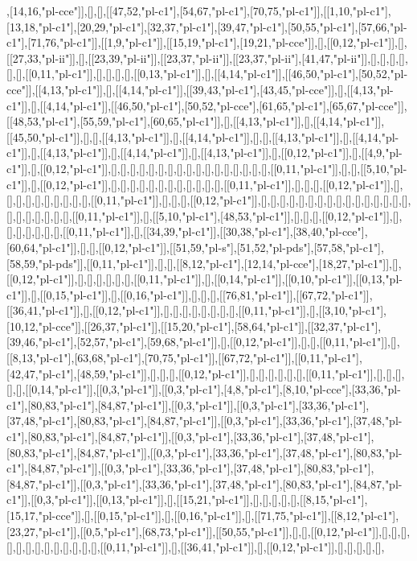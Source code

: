 ,[14,16,"pl-cce"]],[],[],[[47,52,"pl-c1"],[54,67,"pl-c1"],[70,75,"pl-c1"]],[[1,10,"pl-c1"],[13,18,"pl-c1"],[20,29,"pl-c1"],[32,37,"pl-c1"],[39,47,"pl-c1"],[50,55,"pl-c1"],[57,66,"pl-c1"],[71,76,"pl-c1"]],[[1,9,"pl-c1"]],[[15,19,"pl-c1"],[19,21,"pl-cce"]],[],[[0,12,"pl-c1"]],[],[[27,33,"pl-ii"]],[],[[23,39,"pl-ii"]],[[23,37,"pl-ii"]],[[23,37,"pl-ii"],[41,47,"pl-ii"]],[],[],[],[],[],[],[[0,11,"pl-c1"]],[],[],[],[],[[0,13,"pl-c1"]],[],[[4,14,"pl-c1"]],[[46,50,"pl-c1"],[50,52,"pl-cce"]],[[4,13,"pl-c1"]],[],[[4,14,"pl-c1"]],[[39,43,"pl-c1"],[43,45,"pl-cce"]],[],[[4,13,"pl-c1"]],[],[[4,14,"pl-c1"]],[[46,50,"pl-c1"],[50,52,"pl-cce"],[61,65,"pl-c1"],[65,67,"pl-cce"]],[[48,53,"pl-c1"],[55,59,"pl-c1"],[60,65,"pl-c1"]],[],[[4,13,"pl-c1"]],[],[[4,14,"pl-c1"]],[[45,50,"pl-c1"]],[],[],[[4,13,"pl-c1"]],[],[[4,14,"pl-c1"]],[],[],[[4,13,"pl-c1"]],[],[[4,14,"pl-c1"]],[],[[4,13,"pl-c1"]],[],[[4,14,"pl-c1"]],[],[[4,13,"pl-c1"]],[],[[0,12,"pl-c1"]],[],[[4,9,"pl-c1"]],[],[[0,12,"pl-c1"]],[],[],[],[],[],[],[],[],[],[],[],[],[],[],[],[],[],[[0,11,"pl-c1"]],[],[],[[5,10,"pl-c1"]],[],[[0,12,"pl-c1"]],[],[],[],[],[],[],[],[],[],[],[],[],[[0,11,"pl-c1"]],[],[],[],[[0,12,"pl-c1"]],[],[],[],[],[],[],[],[],[],[],[[0,11,"pl-c1"]],[],[],[],[[0,12,"pl-c1"]],[],[],[],[],[],[],[],[],[],[],[],[],[],[],[],[],[],[],[],[],[],[],[],[[0,11,"pl-c1"]],[],[[5,10,"pl-c1"],[48,53,"pl-c1"]],[],[],[],[[0,12,"pl-c1"]],[],[],[],[],[],[],[],[[0,11,"pl-c1"]],[],[[34,39,"pl-c1"]],[[30,38,"pl-c1"],[38,40,"pl-cce"],[60,64,"pl-c1"]],[],[],[[0,12,"pl-c1"]],[[51,59,"pl-s"],[51,52,"pl-pds"],[57,58,"pl-c1"],[58,59,"pl-pds"]],[[0,11,"pl-c1"]],[],[],[[8,12,"pl-c1"],[12,14,"pl-cce"],[18,27,"pl-c1"]],[],[[0,12,"pl-c1"]],[],[],[],[],[],[],[[0,11,"pl-c1"]],[],[[0,14,"pl-c1"]],[[0,10,"pl-c1"]],[[0,13,"pl-c1"]],[],[[0,15,"pl-c1"]],[],[[0,16,"pl-c1"]],[],[],[],[[76,81,"pl-c1"]],[[67,72,"pl-c1"]],[[36,41,"pl-c1"]],[],[[0,12,"pl-c1"]],[],[],[],[],[],[],[],[],[[0,11,"pl-c1"]],[],[[3,10,"pl-c1"],[10,12,"pl-cce"]],[[26,37,"pl-c1"]],[[15,20,"pl-c1"],[58,64,"pl-c1"]],[[32,37,"pl-c1"],[39,46,"pl-c1"],[52,57,"pl-c1"],[59,68,"pl-c1"]],[],[[0,12,"pl-c1"]],[],[],[[0,11,"pl-c1"]],[],[[8,13,"pl-c1"],[63,68,"pl-c1"],[70,75,"pl-c1"]],[[67,72,"pl-c1"]],[[0,11,"pl-c1"],[42,47,"pl-c1"],[48,59,"pl-c1"]],[],[],[],[[0,12,"pl-c1"]],[],[],[],[],[],[],[[0,11,"pl-c1"]],[],[],[],[],[],[[0,14,"pl-c1"]],[[0,3,"pl-c1"]],[[0,3,"pl-c1"],[4,8,"pl-c1"],[8,10,"pl-cce"],[33,36,"pl-c1"],[80,83,"pl-c1"],[84,87,"pl-c1"]],[[0,3,"pl-c1"]],[[0,3,"pl-c1"],[33,36,"pl-c1"],[37,48,"pl-c1"],[80,83,"pl-c1"],[84,87,"pl-c1"]],[[0,3,"pl-c1"],[33,36,"pl-c1"],[37,48,"pl-c1"],[80,83,"pl-c1"],[84,87,"pl-c1"]],[[0,3,"pl-c1"],[33,36,"pl-c1"],[37,48,"pl-c1"],[80,83,"pl-c1"],[84,87,"pl-c1"]],[[0,3,"pl-c1"],[33,36,"pl-c1"],[37,48,"pl-c1"],[80,83,"pl-c1"],[84,87,"pl-c1"]],[[0,3,"pl-c1"],[33,36,"pl-c1"],[37,48,"pl-c1"],[80,83,"pl-c1"],[84,87,"pl-c1"]],[[0,3,"pl-c1"],[33,36,"pl-c1"],[37,48,"pl-c1"],[80,83,"pl-c1"],[84,87,"pl-c1"]],[[0,3,"pl-c1"]],[[0,13,"pl-c1"]],[],[[15,21,"pl-c1"]],[],[],[],[],[],[[8,15,"pl-c1"],[15,17,"pl-cce"]],[],[[0,15,"pl-c1"]],[],[[0,16,"pl-c1"]],[],[[71,75,"pl-c1"]],[[8,12,"pl-c1"],[23,27,"pl-c1"]],[[0,5,"pl-c1"],[68,73,"pl-c1"]],[[50,55,"pl-c1"]],[],[],[[0,12,"pl-c1"]],[],[],[],[],[],[],[],[],[],[],[],[],[],[[0,11,"pl-c1"]],[],[[36,41,"pl-c1"]],[],[[0,12,"pl-c1"]],[],[],[],[],[],